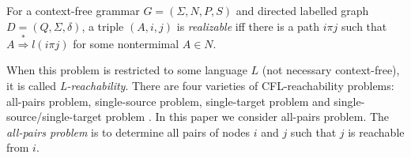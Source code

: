 For a context-free grammar $G = (\Sigma, N, P, S)$ and directed labelled graph $D = (Q, \Sigma, \delta)$, a triple $(A, i, j)$ is \textit{realizable} iff there is a path $i\pi j$ such that $A \stackrel {*}{\Rightarrow } l(i\pi j)$ for some nontermimal $A \in N$.


When this problem is restricted to some language $L$ (not necessary context-free), it is called \textit{L-reachability}. There are four varieties of CFL-reachability problems: all-pairs problem, single-source problem, single-target problem and single-source/single-target problem \cite{RepsBasic}. In this paper we consider all-pairs problem. The \textit{all-pairs problem} is to determine all pairs of nodes $i$ and $j$ such that $j$ is reachable from $i$. 